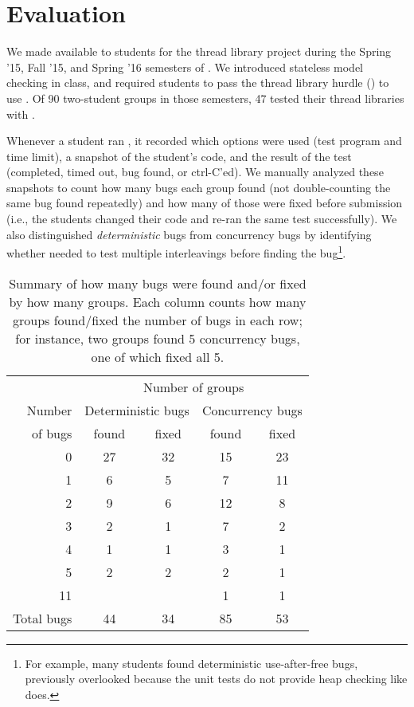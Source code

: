 \section{Evaluation}
\label{sec:eval}

We made \landslide available to students for the thread library project
during the Spring '15, Fall '15, and Spring '16 semesters of \fourten.
We introduced stateless model checking in class, %
and required students to pass the thread library hurdle (\sect{\ref{sec:grading}}) to use \landslide.
Of 90 two-student groups in those semesters, 47 tested their thread libraries with \landslide.

Whenever a student ran \landslide,
it recorded which options were used (test program and time limit),
a snapshot of the student's code,
and the result of the test (completed, timed out, bug found, or ctrl-C'ed).
%
We manually analyzed these snapshots to count how many bugs each group found
(not double-counting the same bug found repeatedly)
and how many of those were fixed before submission
(i.e., the students changed their code and re-ran the same test successfully).
%
We also distinguished {\em deterministic} bugs from concurrency bugs
by identifying whether \landslide needed to test multiple interleavings before finding the bug\footnote{
	For example, many students found deterministic use-after-free bugs,
	previously overlooked because the unit tests do not provide heap checking like \landslide does.
}.

\begin{table}[t]
	\begin{center}
	\begin{tabular}{r|cc|cc}
	& \multicolumn{4}{c}{Number of groups} \\
	Number & \multicolumn{2}{c|}{Deterministic bugs} & \multicolumn{2}{c}{Concurrency bugs} \\
	of bugs	& found & fixed & found & fixed \\
	\hline
	0	& 27	& 32	& 15	& 23	\\
	1	& 6	& 5	& 7	& 11	\\
	2	& 9	& 6	& 12	& 8	\\
	3	& 2	& 1	& 7	& 2	\\
	4	& 1	& 1	& 3	& 1	\\
	5	& 2	& 2	& 2	& 1	\\
	11	& 	& 	& 1	& 1	\\
	\hline
	Total bugs
		& 44	& 34	& 85	& 53	\\
	\end{tabular}
	\end{center}
	\caption{Summary of how many bugs were found and/or fixed by how many groups.
	Each column counts how many groups found/fixed the number of bugs in each row;
	for instance, two groups found 5 concurrency bugs, one of which fixed all 5.}
	\label{tab:this-table-sucks-but-it's-the-best-i-got}
\end{table}

